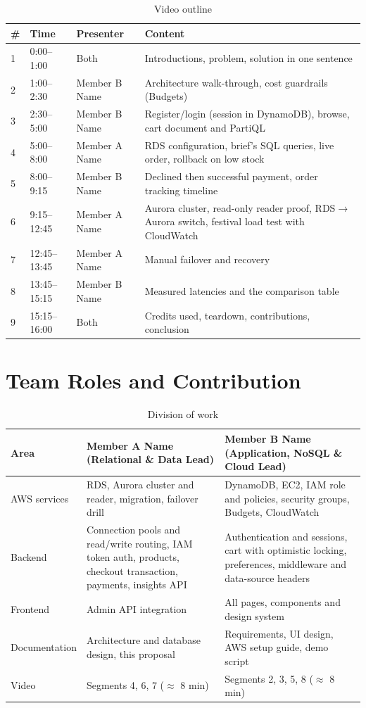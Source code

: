 \documentclass[11pt,a4paper]{article}
\newcommand{\memberA}{Member A Name}
\newcommand{\memberB}{Member B Name}
\begin{document}
\begin{table}[H]
\centering\small
\begin{tabularx}{\linewidth}{@{}l l l X@{}}
\toprule
\textbf{\#} & \textbf{Time} & \textbf{Presenter} & \textbf{Content}\\
\midrule
1 & 0:00--1:00 & Both & Introductions, problem, solution in one sentence\\
2 & 1:00--2:30 & \memberB & Architecture walk-through, cost guardrails (Budgets)\\
3 & 2:30--5:00 & \memberB & Register/login (session in DynamoDB), browse, cart document and PartiQL\\
4 & 5:00--8:00 & \memberA & RDS configuration, brief's SQL queries, live order, rollback on low stock\\
5 & 8:00--9:15 & \memberB & Declined then successful payment, order tracking timeline\\
6 & 9:15--12:45 & \memberA & Aurora cluster, read-only reader proof, RDS$\rightarrow$Aurora switch, festival load test with CloudWatch\\
7 & 12:45--13:45 & \memberA & Manual failover and recovery\\
8 & 13:45--15:15 & \memberB & Measured latencies and the comparison table\\
9 & 15:15--16:00 & Both & Credits used, teardown, contributions, conclusion\\
\bottomrule
\end{tabularx}
\caption{Video outline}
\end{table}

\section{Team Roles and Contribution}
\begin{table}[H]
\centering\small
\begin{tabularx}{\linewidth}{@{}l X X@{}}
\toprule
\textbf{Area} & \textbf{\memberA} (Relational \& Data Lead) & \textbf{\memberB} (Application, NoSQL \& Cloud Lead)\\
\midrule
AWS services & RDS, Aurora cluster and reader, migration, failover drill & DynamoDB, EC2, IAM role and policies, security groups, Budgets, CloudWatch\\
Backend & Connection pools and read/write routing, IAM token auth, products, checkout transaction, payments, insights API & Authentication and sessions, cart with optimistic locking, preferences, middleware and data-source headers\\
Frontend & Admin API integration & All pages, components and design system\\
Documentation & Architecture and database design, this proposal & Requirements, UI design, AWS setup guide, demo script\\
Video & Segments 4, 6, 7 ($\approx$ 8 min) & Segments 2, 3, 5, 8 ($\approx$ 8 min)\\
\bottomrule
\end{tabularx}
\caption{Division of work}
\end{table}
\end{document}

